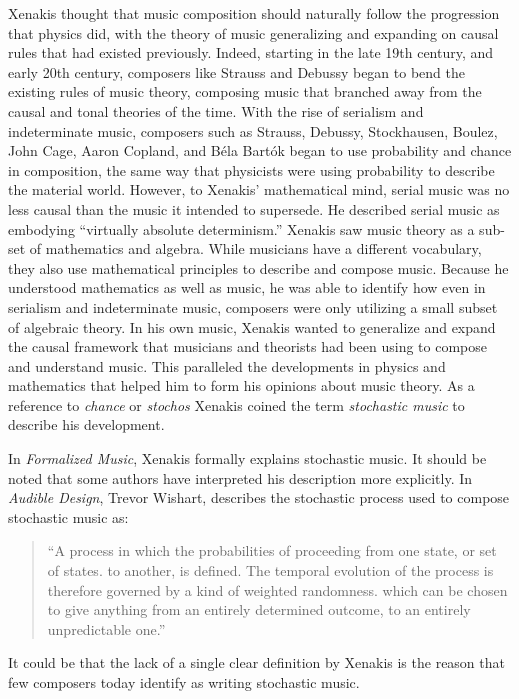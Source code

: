 Xenakis thought that music composition should naturally follow
the progression that physics did, with the theory of music
generalizing and expanding on causal rules that had existed
previously. Indeed, starting in the late 19th century, and early 20th
century, composers like Strauss and Debussy began to bend the existing
rules of music theory, composing music that branched away from the
causal and tonal theories of the time. With the rise of
serialism
and indeterminate music, composers such as Strauss, Debussy,
Stockhausen, Boulez, John Cage, Aaron Copland, and B\'{e}la Bart\'{o}k
began to use probability and chance in composition, the same way that
physicists were using probability to describe the material
world. However, to Xenakis' mathematical mind, serial music was no
less causal than the music it intended to supersede. He described
serial music as embodying ``virtually absolute
determinism.''\cite{xenakis1992formalized} Xenakis saw music theory as
a sub-set of mathematics and algebra. While musicians have a different
vocabulary, they also use mathematical principles to describe and
compose music. Because he understood mathematics as well as music, he
was able to identify how even in serialism and indeterminate music,
composers were only utilizing a small subset of algebraic theory. In
his own music, Xenakis wanted to generalize and expand the causal
framework that musicians and theorists had been using to compose and
understand music. This paralleled the developments in physics and
mathematics that helped him to form his opinions about music theory.
As a reference to \emph{chance} or \emph{stochos} Xenakis coined the
term \emph{stochastic music} to describe his development.

In \textit{Formalized Music}, Xenakis formally explains stochastic
music. It should be noted that some authors have interpreted his
description more explicitly. In \textit{Audible Design}, Trevor
Wishart, describes the stochastic process used to compose stochastic
music as:
\begin{quotation}
  ``A process in which the probabilities of proceeding from one state,
  or set of states. to another, is defined. The temporal evolution of
  the process is therefore governed by a kind of weighted
  randomness. which can be chosen to give anything from an entirely
  determined outcome, to an entirely unpredictable
  one.''\cite{Wishart1994}
\end{quotation}
It could be that the lack of a single clear definition by Xenakis is
the reason that few composers today identify as writing stochastic
music.

